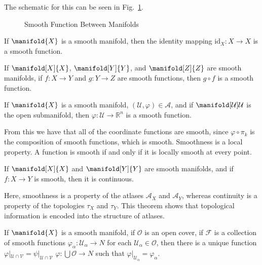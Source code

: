 \documentclass{article}                                                        %
\begin{document}
            The schematic for this can be seen in
            Fig.~\ref{fig:Smooth_Function_Between_Manifolds}.
            \begin{figure}[H]
                \centering
                \captionsetup{type=figure}
                
                \caption{Smooth Function Between Manifolds}
                \label{fig:Smooth_Function_Between_Manifolds}
            \end{figure}
            \begin{theorem}
                If $\manifold{X}$ is a smooth manifold, then the identity
                mapping $\textrm{id}_{X}:X\rightarrow{X}$ is a smooth function.
            \end{theorem}
            \begin{theorem}
                If $\manifold[X]{X}$, $\manifold[Y]{Y}$, and $\manifold[Z]{Z}$
                are smooth manifolds, if $f:X\rightarrow{Y}$ and
                $g:Y\rightarrow{Z}$ are smooth functions, then $g\circ{f}$ is a
                smooth function.
            \end{theorem}
            \begin{theorem}
                If $\manifold{X}$ is a smooth manifold,
                $(\mathcal{U},\varphi)\in\mathcal{A}$, and if
                $\manifold[\mathcal{U}]{\mathcal{U}}$ is the open submanifold,
                then $\varphi:\mathcal{U}\rightarrow\mathbb{R}^{n}$ is a smooth
                function.
            \end{theorem}
            From this we have that all of the coordinate functions are smooth,
            since $\varphi\circ\pi_{k}$ is the composition of smooth functions,
            which is smooth. Smoothness is a local property. A function is
            smooth if and only if it is locally smooth at every point.
            \begin{theorem}
                If $\manifold[X]{X}$ and $\manifold[Y]{Y}$ are smooth manifolds,
                and if $f:X\rightarrow{Y}$ is smooth, then it is continuous.
            \end{theorem}
            Here, smoothness is a property of the atlases $\mathcal{A}_{X}$ and
            $\mathcal{A}_{Y}$, whereas continuity is a property of the
            topologies $\tau_{X}$ and $\tau_{Y}$. This theorem shows that
            topological information is encoded into the structure of atlases.
            \begin{theorem}
                If $\manifold{X}$ is a smooth manifold, if $\mathcal{O}$ is an
                open cover, if $\mathcal{F}$ is a collection of smooth functions
                $\varphi_{\alpha}:\mathcal{U}_{\alpha}\rightarrow{N}$ for each
                $\mathcal{U}_{\alpha}\in\mathcal{O}$, then there is a unique
                function $\varphi|_{\mathcal{U}\cap\mathcal{V}}=%
                \psi|_{\mathcal{U}\cap\mathcal{V}}$
                $\varphi:\bigcup\mathcal{O}\rightarrow{N}$ such that
                $\varphi|_{\mathcal{U}_{\alpha}}=\varphi_{\alpha}$.
            \end{theorem}
\end{document}

